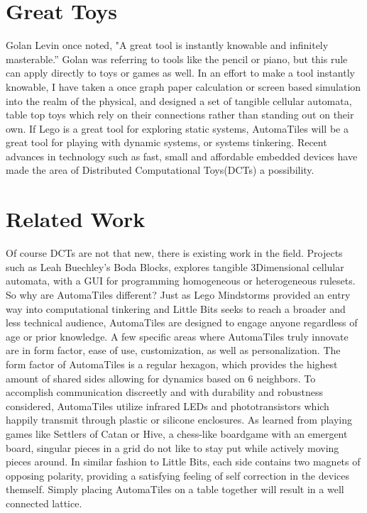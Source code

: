 \section{Great Toys}

Golan Levin once noted, "A great tool is instantly knowable and infinitely masterable.” Golan was referring to tools like the pencil or piano, but this rule can apply directly to toys or games as well. In an effort to make a tool instantly knowable, I have taken a once graph paper calculation or screen based simulation into the realm of the physical, and designed a set of tangible cellular automata, table top toys which rely on their connections rather than standing out on their own. If Lego is a great tool for exploring static systems, AutomaTiles will be a great tool for playing with dynamic systems, or systems tinkering. Recent advances in technology such as fast, small and affordable embedded devices have made the area of Distributed Computational Toys(DCTs) a possibility.

\section{Related Work}

Of course DCTs are not that new, there is existing work in the field. Projects such as Leah Buechley’s Boda Blocks, explores tangible 3Dimensional cellular automata, with a GUI for programming homogeneous or heterogeneous rulesets. So why are AutomaTiles different? Just as Lego Mindstorms provided an entry way into computational tinkering and Little Bits seeks to reach a broader and less technical audience, AutomaTiles are designed to engage anyone regardless of age or prior knowledge. A few specific areas where AutomaTiles truly innovate are in form factor, ease of use, customization, as well as personalization. The form factor of AutomaTiles is a regular hexagon, which provides the highest amount of shared sides allowing for dynamics based on 6 neighbors. To accomplish communication discreetly and with durability and robustness considered, AutomaTiles utilize infrared LEDs and phototransistors which happily transmit through plastic or silicone enclosures. As learned from playing games like Settlers of Catan or Hive, a chess-like boardgame with an emergent board, singular pieces in a grid do not like to stay put while actively moving pieces around. In similar fashion to Little Bits, each side contains two magnets of opposing polarity, providing a satisfying feeling of self correction in the devices themself. Simply placing AutomaTiles on a table together will result in a well connected lattice. 
